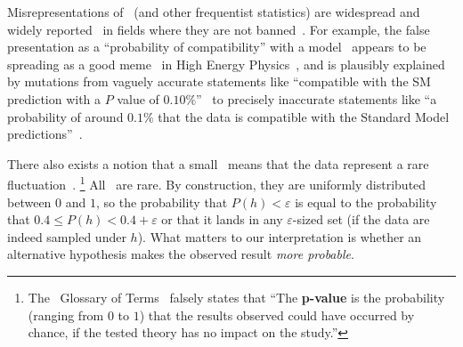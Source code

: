 Misrepresentations of \pvalues\ (and other frequentist statistics) are
widespread and widely reported~\cite{
schervish1996p,
Cohen1994TheEI,
Amrhein2017TheEI,
goodman2008dirty,
greenland2016no,
Bernstein2016princess,
wagenmakers2007practical,
hauer2004harm,
wasserstein2016asa
}
in fields where they are not banned~\cite{
Trafimow2015ban,
woolston2015phychology,
chumra2019time,
shrout1997should,
hunter1997needed
}.
For example, the false presentation as a ``probability of compatibility'' with
a model~\cite{HIGG-2018-04} appears to be spreading as a good
meme~\cite{dawkins1989selfish} in High Energy Physics~\cite{
roth2007fit,
HIGG-2017-09,
HIGG-2018-27,
HIGG-2018-51,
HIGG-2019-14,
EXOT-2016-36,
EXOT-2018-08,
EXOT-2019-15,
HION-2018-19,
chan2019search,
mastrandrea2019searches,
white2019search,
langford2021combination,
IceCube2013search,
IceCube2014searches,
gerasimov2021new
},
and is plausibly explained by mutations from vaguely accurate statements like
``compatible with the SM prediction with a $P$ value of $0.10\%$''~\cite{
lhcb2021test
}
to precisely inaccurate statements like
``a probability of around $0.1\%$ that the data is compatible with the
Standard Model predictions''~\cite{cern2021test}.

There also exists a notion that a small \pvalue\ means that the data
represent a rare fluctuation~\cite{murray1997use, atlas2022glossary}.%
\footnote{%
The \atlas\ Glossary of Terms~\cite{atlas2022glossary} falsely states that
``The \textbf{p-value} is the probability (ranging from $0$ to $1$) that the
results observed could have occurred by chance, if the tested theory has no
impact on the study.''%
}
All \pvalues\ are rare.
By construction, they are uniformly distributed between $0$ and $1$, so the
probability that $P(h) < \varepsilon$ is equal to the probability that
$0.4 \leq P(h) < 0.4 + \varepsilon$ or that it lands in any
$\varepsilon$-sized set
(if the data are indeed sampled under $h$).
What matters to our interpretation is whether an alternative hypothesis
makes the observed result \emph{more probable}.

